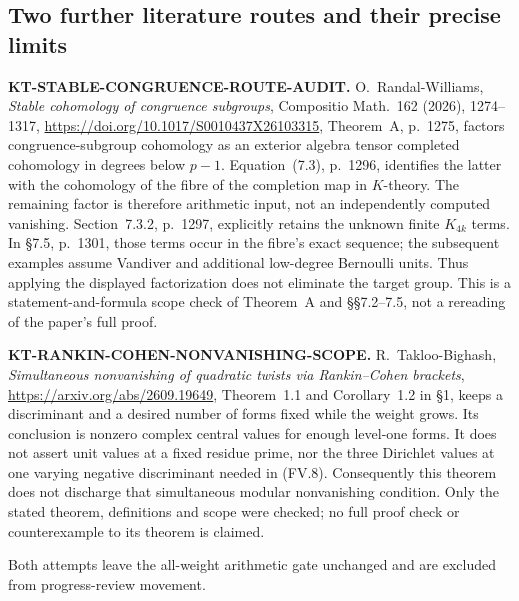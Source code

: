 \documentclass[11pt,a4paper]{article}
\theoremstyle{definition}
\renewcommand{\paragraph}[1]{\par\smallskip\noindent\textbf{#1}\quad\ignorespaces}
\begin{document}


\subsection{Two further literature routes and their precise limits}

\paragraph{KT-STABLE-CONGRUENCE-ROUTE-AUDIT.}
O.~Randal-Williams, \emph{Stable cohomology of congruence
subgroups}, Compositio Math.~162 (2026), 1274--1317,
\url{https://doi.org/10.1017/S0010437X26103315},
Theorem~A, p.~1275, factors congruence-subgroup cohomology
as an exterior algebra tensor completed cohomology in
degrees below $p-1$. Equation~(7.3), p.~1296, identifies
the latter with the cohomology of the fibre of the
completion map in $K$-theory. The remaining factor is
therefore arithmetic input, not an independently computed
vanishing. Section~7.3.2, p.~1297, explicitly retains the
unknown finite $K_{4k}$ terms. In \S7.5, p.~1301, those
terms occur in the fibre's exact sequence; the subsequent
examples assume Vandiver and additional low-degree
Bernoulli units. Thus applying the displayed factorization
does not eliminate the target group. This is a
statement-and-formula scope check of Theorem~A and
\S\S7.2--7.5, not a rereading of the paper's full proof.

\paragraph{KT-RANKIN-COHEN-NONVANISHING-SCOPE.}
R.~Takloo-Bighash, \emph{Simultaneous nonvanishing of
quadratic twists via Rankin--Cohen brackets},
\url{https://arxiv.org/abs/2609.19649}, Theorem~1.1 and
Corollary~1.2 in \S1, keeps a discriminant and a desired
number of forms fixed while the weight grows. Its
conclusion is nonzero complex central values for enough
level-one forms. It does not assert unit values at a
fixed residue prime, nor the three Dirichlet values at
one varying negative discriminant needed in (FV.8).
Consequently this theorem does not discharge that
simultaneous modular nonvanishing condition. Only the
stated theorem, definitions and scope were checked;
no full proof check or counterexample to its theorem
is claimed.

Both attempts leave the all-weight arithmetic gate
unchanged and are excluded from progress-review movement.
\end{document}
